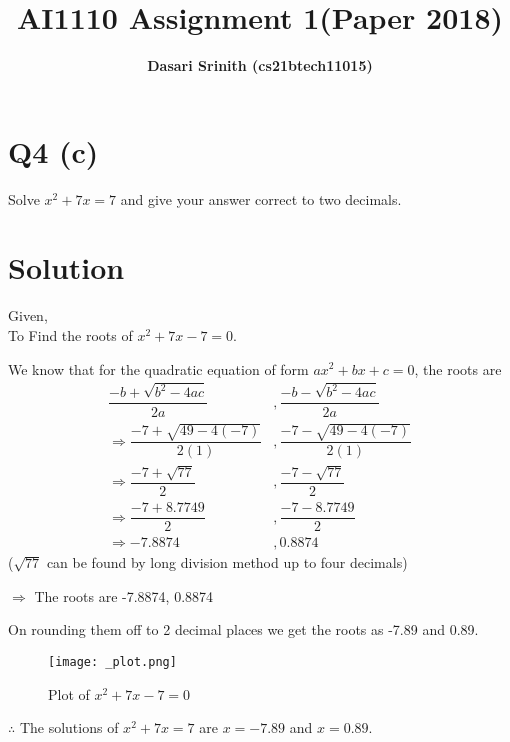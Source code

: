 \documentclass[12pt,letterpaper,twocolumn]{article}
\title{\textbf{AI1110 Assignment 1(Paper 2018)}}
\author{\textbf{Dasari Srinith (cs21btech11015)}}
\date{}
\begin{document}
\maketitle

\section*{Q4 (c)}
    Solve $x^2 + 7x = 7$ and give your answer correct to two decimals.
\vspace{-0.5cm}
\section*{Solution}

    Given,\\
    To Find the roots of $x^2 +7x -7 = 0$.
    
    We know that for the quadratic equation of form $ax^2 + bx +c = 0$,
    the roots are
    \begin{align}
        \dfrac{-b+\sqrt{b^2 -4ac}}{2a}&,\dfrac{-b-\sqrt{b^2 -4ac}}{2a}\\[10pt]
        \Rightarrow \dfrac{-7+\sqrt{49-4(-7)}}{2(1)}&,\dfrac{-7-\sqrt{49 -4(-7)}}{2(1)}\\[10pt]
        \Rightarrow \dfrac{-7+\sqrt{77}}{2}&,\dfrac{-7-\sqrt{77}}{2}\\[10pt]
        \Rightarrow \dfrac{-7+8.7749}{2} &,\dfrac{-7-8.7749}{2}\\[10pt]
        \Rightarrow -7.8874 &, 0.8874
    \end{align}
($\sqrt{77}$ can be found by long division method up to four decimals)
    
$\Rightarrow$ The roots are -7.8874, 0.8874
    
On rounding them off to 2 decimal places we get the roots as -7.89 and 0.89.
    
\begin{figure}[H]
    \centering
    \texttt{[image: \_plot.png]}
    \caption{Plot of $x^2 + 7x - 7 =0 $}
\end{figure}
 
$\therefore$ The solutions of $x^2 + 7x = 7$ are  $x = -7.89$ and $x = 0.89$.
    
\end{document}
